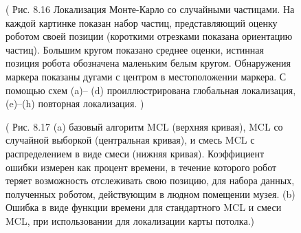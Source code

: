 \documentclass[10pt,a4paper]{article}
\begin{document}
\begin{figure}[H]
	\caption{ ( Рис. 8.16 Локализация Монте-Карло со случайными частицами. На каждой картинке показан набор частиц, представляющий оценку роботом своей позиции (короткими отрезками показана ориентацию частиц). Большим кругом показано среднее оценки, истинная позиция робота обозначена маленьким белым кругом. Обнаружения маркера показаны дугами с центром в местоположении маркера. С помощью схем (a)–	(d) проиллюстрирована глобальная локализация, (e)–(h) повторная локализация. 
		)}
	\label{fig:816orig}
\end{figure}

\begin{figure}[H]
	\caption{ ( Рис. 8.17 (a) базовый алгоритм MCL (верхняя кривая), MCL со случайной выборкой (центральная кривая), и смесь MCL с распределением в виде смеси (нижняя кривая). Коэффициент ошибки измерен как процент времени, в течение которого робот теряет возможность отслеживать свою позицию, для набора данных, полученных роботом, действующим в людном помещении музея. (b) Ошибка в виде функции времени для стандартного MCL и смеси MCL, при использовании для локализации карты потолка.)}
	\label{fig:817orig}
\end{figure}
\end{document}
